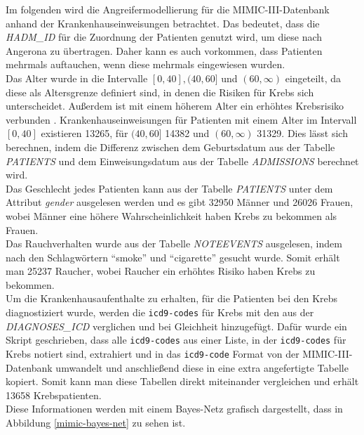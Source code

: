 \documentclass[german,version-2020-11]{uzl-thesis}
\begin{document}
Im folgenden wird die Angreifermodellierung für die MIMIC-III-Datenbank anhand der Krankenhauseinweisungen betrachtet. Das bedeutet, dass die \textit{HADM\_ID} für die Zuordnung der Patienten genutzt wird, um diese nach Angerona zu übertragen. Daher kann es auch vorkommen, dass Patienten mehrmals auftauchen, wenn diese mehrmals eingewiesen wurden.\\ 
Das Alter wurde in die Intervalle $[0,40], (40,60]$ und $(60,\infty)$ eingeteilt, da diese als Altersgrenze definiert sind, in denen die Risiken für Krebs sich unterscheidet. Außerdem ist mit einem höherem Alter ein erhöhtes Krebsrisiko verbunden \cite{13}. Krankenhauseinweisungen für Patienten mit einem Alter im Intervall $[0,40]$ existieren 13265, für $(40,60]$ 14382 und $(60,\infty)$ 31329. Dies lässt sich berechnen, indem die Differenz zwischen dem Geburtsdatum aus der Tabelle \textit{PATIENTS} und dem Einweisungsdatum aus der Tabelle \textit{ADMISSIONS} berechnet wird.\\
Das Geschlecht jedes Patienten kann aus der Tabelle \textit{PATIENTS} unter dem Attribut \textit{gender} ausgelesen werden und es gibt 32950 Männer und 26026 Frauen, wobei Männer eine höhere Wahrscheinlichkeit haben Krebs zu bekommen als Frauen. \\
Das Rauchverhalten wurde aus der Tabelle \textit{NOTEEVENTS} ausgelesen, indem nach den Schlagwörtern \enquote{smoke} und \enquote{cigarette} gesucht wurde. Somit erhält man 25237 Raucher, wobei Raucher ein erhöhtes Risiko haben Krebs zu bekommen. \\
Um die Krankenhausaufenthalte zu erhalten, für die Patienten bei den  Krebs diagnostiziert wurde, werden die \texttt{icd9-codes} für Krebs \cite{16} mit den aus der \textit{DIAGNOSES\_ICD} verglichen und bei Gleichheit hinzugefügt. Dafür wurde ein Skript geschrieben, dass alle \texttt{icd9-codes} aus einer Liste, in der \texttt{icd9-codes} für Krebs notiert sind, extrahiert und in  das \texttt{icd9-code} Format von der MIMIC-III-Datenbank umwandelt und anschließend diese in eine extra angefertigte Tabelle kopiert. Somit kann man diese Tabellen direkt miteinander vergleichen und erhält 13658 Krebspatienten. \\ 
Diese Informationen werden mit einem Bayes-Netz grafisch dargestellt, dass in Abbildung \ref{mimic-bayes-net} zu sehen ist.\\
\end{document}
